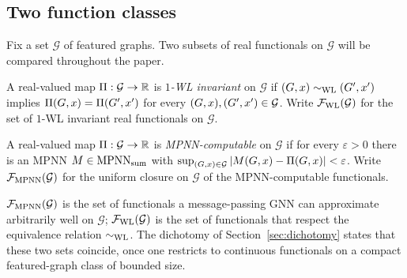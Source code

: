 \subsection{Two function classes}\label{sec:classes}

Fix a set $\mathcal{G}$ of featured graphs. Two subsets of real
functionals on $\mathcal{G}$ will be compared throughout the paper.

\begin{definition}\label{def:wl-inv}
A real-valued map $\Pi : \mathcal{G} \to \mathbb{R}$ is \emph{$1$-WL
invariant} on $\mathcal{G}$ if $(G, x) \sim_{\mathrm{WL}} (G', x')$
implies $\Pi(G, x) = \Pi(G', x')$ for every $(G, x),
(G', x') \in \mathcal{G}$.
Write $\mathcal{F}_{\mathrm{WL}}(\mathcal{G})$ for the set of $1$-WL
invariant real functionals on $\mathcal{G}$.
\end{definition}

\begin{definition}\label{def:mpnn-comp}
A real-valued map $\Pi : \mathcal{G} \to \mathbb{R}$ is
\emph{MPNN-computable} on $\mathcal{G}$ if for every $\varepsilon > 0$
there is an MPNN $M \in \mathrm{MPNN}_{\mathrm{sum}}$ with
$\sup_{(G, x) \in \mathcal{G}} |M(G, x) - \Pi(G, x)| <
\varepsilon$.
Write $\mathcal{F}_{\mathrm{MPNN}}(\mathcal{G})$ for the uniform closure on
$\mathcal{G}$ of the MPNN-computable functionals.
\end{definition}

$\mathcal{F}_{\mathrm{MPNN}}(\mathcal{G})$ is the set of functionals a
message-passing GNN can approximate arbitrarily well on
$\mathcal{G}$; $\mathcal{F}_{\mathrm{WL}}(\mathcal{G})$ is the set of
functionals that respect the equivalence relation $\sim_{\mathrm{WL}}$. The
dichotomy of Section~\ref{sec:dichotomy} states that these two sets
coincide, once one restricts to continuous functionals on a compact
featured-graph class of bounded size.
